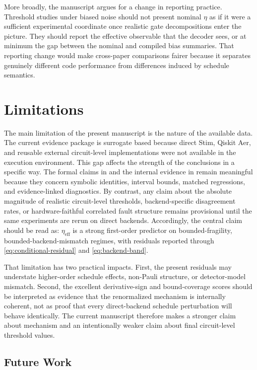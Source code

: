 \documentclass{article} %
\begin{document}
More broadly, the manuscript argues for a change in reporting practice. Threshold studies under biased noise should not present nominal $\eta$ as if it were a sufficient experimental coordinate once realistic gate decompositions enter the picture. They should report the effective observable that the decoder sees, or at minimum the gap between the nominal and compiled bias summaries. That reporting change would make cross-paper comparisons fairer because it separates genuinely different code performance from differences induced by schedule semantics.

\section{Limitations}
\label{sec:limitations}

The main limitation of the present manuscript is the nature of the available data. The current evidence package is surrogate based because direct Stim, Qiskit Aer, and reusable external circuit-level implementations were not available in the execution environment. This gap affects the strength of the conclusions in a specific way. The formal claims in  and the internal evidence in  remain meaningful because they concern symbolic identities, interval bounds, matched regressions, and evidence-linked diagnostics. By contrast, any claim about the absolute magnitude of realistic circuit-level thresholds, backend-specific disagreement rates, or hardware-faithful correlated fault structure remains provisional until the same experiments are rerun on direct backends. Accordingly, the central claim should be read as: $\eta_{\mathrm{eff}}$ is a strong first-order predictor on bounded-fragility, bounded-backend-mismatch regimes, with residuals reported through \eqref{eq:conditional-residual} and \eqref{eq:backend-band}.

That limitation has two practical impacts. First, the present residuals may understate higher-order schedule effects, non-Pauli structure, or detector-model mismatch. Second, the excellent derivative-sign and bound-coverage scores should be interpreted as evidence that the renormalized mechanism is internally coherent, not as proof that every direct-backend schedule perturbation will behave identically. The current manuscript therefore makes a stronger claim about mechanism and an intentionally weaker claim about final circuit-level threshold values.

\subsection{Future Work}
\label{sec:future}
\end{document}
